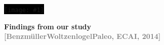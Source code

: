 \documentclass[9pt,mathserif,unknownkeysallowed,xcolor=dvipsnames]{beamer}
\newcommand{\chriscite}[1]{{\small \textcolor{gray}{[#1]}}}
\newenvironment{transitionframe}[2]
{
\begin{frame}{} \Large
\centering
\colorbox{#2}{\texttt{[image: \#1]}}
\vfill
}
{

\end{frame}
}
\newenvironment{changemargin}[2]{%
  \begin{list}{}{%
    \setlength{\topsep}{0pt}%
    \setlength{\leftmargin}{#1}%
    \setlength{\rightmargin}{#2}%
    \setlength{\listparindent}{\parindent}%
    \setlength{\itemindent}{\parindent}%
    \setlength{\parsep}{\parskip}%
  }%
\item[]
}{\end{list}}
\begin{document}











\begin{transitionframe}{./Images/Transitions/NietzscheGod3}{black}
\textbf{Findings from our study \\ \chriscite{Benzm\"ullerWoltzenlogelPaleo, ECAI, 2014}}
\end{transitionframe}
\end{document}
